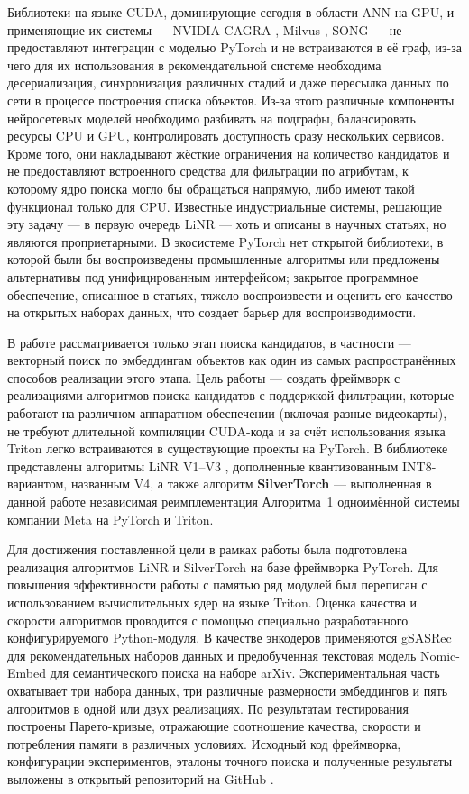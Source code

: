 \documentclass[14pt,a4paper]{extreport}
\numberwithin{figure}{chapter}
\numberwithin{table}{chapter}
\numberwithin{equation}{chapter}
\begin{document}
Библиотеки на языке CUDA, доминирующие сегодня в области ANN на GPU, и применяющие их системы --- NVIDIA CAGRA \cite{ootomo2024cagra}, Milvus \cite{wang2021milvus}, SONG \cite{zhao2020song} --- не предоставляют интеграции с моделью PyTorch и не встраиваются в её граф, из-за чего для их использования в рекомендательной системе необходима десериализация, синхронизация различных стадий и даже пересылка данных по сети в процессе построения списка объектов. Из-за этого различные компоненты нейросетевых моделей необходимо разбивать на подграфы, балансировать ресурсы CPU и GPU, контролировать доступность сразу нескольких сервисов. Кроме того, они накладывают жёсткие ограничения на количество кандидатов и не предоставляют встроенного средства для фильтрации по атрибутам, к которому ядро поиска могло бы обращаться напрямую, либо имеют такой функционал только для CPU. Известные индустриальные системы, решающие эту задачу --- в первую очередь LiNR \cite{borisyuk2024linr} --- хоть и описаны в научных статьях, но являются проприетарными. В экосистеме PyTorch нет открытой библиотеки, в которой были бы воспроизведены промышленные алгоритмы или предложены альтернативы под унифицированным интерфейсом; закрытое программное обеспечение, описанное в статьях, тяжело воспроизвести и оценить его качество на открытых наборах данных, что создает барьер для воспроизводимости.

В работе рассматривается только этап поиска кандидатов, в частности --- векторный поиск по эмбеддингам объектов как один из самых распространённых способов реализации этого этапа. Цель работы --- создать фреймворк с реализациями алгоритмов поиска кандидатов с поддержкой фильтрации, которые работают на различном аппаратном обеспечении (включая разные видеокарты), не требуют длительной компиляции CUDA-кода и за счёт использования языка Triton легко встраиваются в существующие проекты на PyTorch. В библиотеке представлены алгоритмы LiNR V1--V3 \cite{borisyuk2024linr}, дополненные квантизованным INT8-вариантом, названным V4, а также алгоритм \textbf{SilverTorch} --- выполненная в данной работе независимая реимплементация Алгоритма~1 одноимённой системы компании Meta \cite{xue2025silvertorch} на PyTorch и Triton.

Для достижения поставленной цели в рамках работы была подготовлена реализация алгоритмов LiNR и SilverTorch на базе фреймворка PyTorch. Для повышения эффективности работы с памятью ряд модулей был переписан с использованием вычислительных ядер на языке Triton. Оценка качества и скорости алгоритмов проводится с помощью специально разработанного конфигурируемого Python-модуля. В качестве энкодеров применяются gSASRec \cite{petrov2023gsasrec} для рекомендательных наборов данных и предобученная текстовая модель Nomic-Embed \cite{nussbaum2024nomic} для семантического поиска на наборе arXiv. Экспериментальная часть охватывает три набора данных, три различные размерности эмбеддингов и пять алгоритмов в одной или двух реализациях. По результатам тестирования построены Парето-кривые, отражающие соотношение качества, скорости и потребления памяти в различных условиях. Исходный код фреймворка, конфигурации экспериментов, эталоны точного поиска и полученные результаты выложены в открытый репозиторий на GitHub \cite{torchretrieve_repo}.
\end{document}
